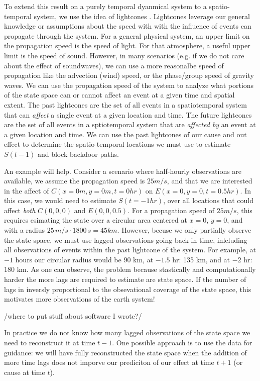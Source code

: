 \documentclass[12pt]{article}
\begin{document}
To extend this result on a purely temporal dyanmical system to a
spatio-temporal system, we use the idea of lightcones
\citep{PhysRevLett.84.1890,
  montanez2015licors,doi:10.1063/1.5021130}. Lightcones leverage our
general knowledge or assumptions about the speed with with the
influence of events can propagate through the system. For a general
physical system, an upper limit on the propagation speed is the speed
of light. For that atmosphere, a useful upper limit is the speed of
sound. However, in many scenarios (e.g. if we do not care about the
effect of soundwaves), we can use a more reasonalbe speed of
propagation like the advection (wind) speed, or the phase/group speed
of gravity waves. We can use the propagation speed of the system to
analyze what portions of the state space can or cannot affect an event
at a given time and spatial extent. The past lightcones are the set of
all events in a spatiotemporal system that can \textit{affect} a
single event at a given location and time. The future lightcones are
the set of all events in a sptiotemporal system that are
\textit{affected by} an event at a given location and time. We can use
the past lightcones of our cause and out effect to determine the
spatio-temporal locations we must use to estimate $S(t-1)$ and block
backdoor paths.

An example will help. Consider a scenario where half-hourly
observations are available, we assume the propagation speed is
$25 m/s$, and that we are interested in the affect of
$C(x=0 m, y=0 m, t=0 hr)$ on $E(x=0, y=0, t=0.5 hr)$. In this case, we
would need to estimate $S(t=-1 hr)$, over all locations that could
affect \emph{both} $C(0,0,0)$ and $E(0,0,0.5)$.  For a propagation
speed of $25 m/s$, this requires esimating the state over a circular
area centered at $x=0$, $y=0$, and with a radius
$25 \, m/s \cdot 1800 \, s = 45 km$. However, becuse we only partially
observe the state space, we must use lagged observations going back in
time, inlcluding all observations of events within the past lightcone
of the system. For example, at $-1$ hours our circular radius would be
90 km, at $-1.5$ hr: 135 km, and at $-2$ hr: 180 km. As one can
observe, the problem because stastically and computationally harder
the more lags are required to estimate are state space. If the number
of lags in inversly proportional to the obsevational coverage of the
state space, this motivates more observations of the earth system!

/where to put stuff about software I wrote?/

In practice we do not know how many lagged observations of the state
space we need to reconstruct it at time $t-1$. One possible approach
is to use the data for guidance: we will have fully reconstructed the
state space when the addition of more time lags does not imporve our
prediciton of our effect at time \(t+1\) (or cause at time $t$).
\end{document}
